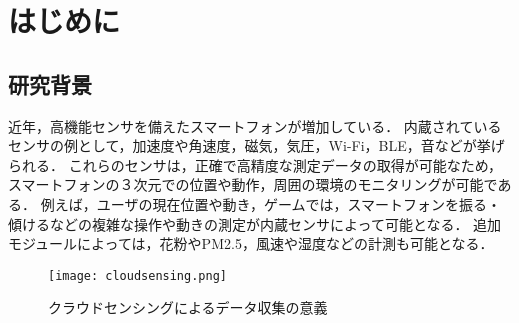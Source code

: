 \chapter{はじめに}
\thispagestyle{myheadings}


\section{研究背景}
\label{sec:schedule}

近年，高機能センサを備えたスマートフォンが増加している．
内蔵されているセンサの例として，加速度や角速度，磁気，気圧，Wi-Fi，BLE，音などが挙げられる．
これらのセンサは，正確で高精度な測定データの取得が可能なため，スマートフォンの３次元での位置や動作，周囲の環境のモニタリングが可能である．
例えば，ユーザの現在位置や動き，ゲームでは，スマートフォンを振る・傾けるなどの複雑な操作や動きの測定が内蔵センサによって可能となる．
追加モジュールによっては，花粉やPM2.5，風速や湿度などの計測も可能となる．

\begin{figure}[H]
  \centering
  \texttt{[image: cloudsensing.png]}
  \caption{クラウドセンシングによるデータ収集の意義}
  \label{cloudsensing}
\end{figure}


